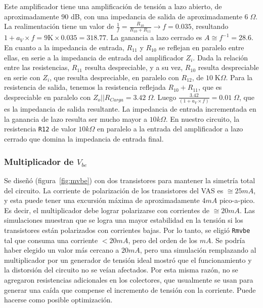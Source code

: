 \documentclass[a4paper,12pt,twoside]{article}
\begin{document}
Este amplificador tiene una amplificación de tensión a lazo abierto, de aproximadamente $90$ dB, con una impedancia de salida de aproximadamente $6\;\Omega$.
La realimentación tiene un valor de $\frac{1}{f} = \frac{R_{10}}{R_{10} + R_{11}} \rightarrow f = 0.035$, resultando $1+a_V\times f = 9\mathrm{K} \times 0.035 = 318.77$. La ganancia a lazo cerrado es $A\cong f^{-1} =28.6$. En cuanto a la impedancia de entrada, $R_{11}$ y $R_{10}$ se reflejan en paralelo entre ellas, en serie a la impedancia de entrada del amplificador $Z_i$. Dada la relación entre las resistencias, $R_{11}$ resulta despreciable, y a su vez, $R_{10}$ resulta despreciable en serie con $Z_i$, que resulta despreciable, en paralelo con $R_{12}$, de $10\; \mathrm{K}\Omega$. Para la resistencia de salida, tenemos la resistencia reflejada $R_{10} + R_{11}$, que es despreciable en paralelo con $Z_o || R_{Carga} = 3.42\; \Omega$. Luego $\frac{3.42}{(1 + a_V \times f)} = 0.01\; \Omega$, que es la impedancia de salida resultante. La impedancia de entrada incrementada en la ganancia de lazo resulta ser mucho mayor a $10k\Omega$. En nuestro circuito, la resistencia \texttt{R12} de valor $10k\Omega$ en paralelo a la entrada del amplificador a lazo cerrado que domina la impedancia de entrada final.


\subsubsection{Multiplicador de $V_{be}$}


Se diseñó (figura~\ref{fig:mvbe}) con dos transistores para mantener la simetría total del circuito. La corriente de polarización de los transistores del VAS es $\cong 25mA$, y esta puede tener una excursión máxima de aproximadamente $4mA$ pico-a-pico. Es decir, el multiplicador debe lograr polarizarse con corrientes de $\cong 20mA$. Las simulaciones muestran que se logra una mayor estabilidad en la tensión si los transistores están polarizados con corrientes bajas. Por lo tanto, se eligió \texttt{Rmvbe} tal que consuma una corriente $<20mA$, pero del orden de los $mA$. Se podría haber elegido un valor más cercano a $20mA$, pero una simulación remplazando al multiplicador por un generador de tensión ideal mostró que el funcionamiento y la distorsión del circuito no se veían afectados. Por esta misma razón, no se agregaron resistencias adicionales en los colectores, que usualmente se usan para generar una caída que compense el incremento de tensión con la corriente. Puede hacerse como posible optimización.
\end{document}
